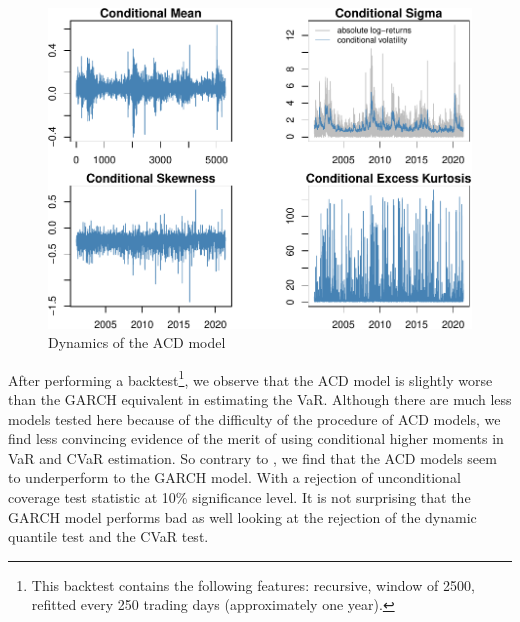 \documentclass[a4paper, nobind]{templates/ociamthesis}
\begin{document}
\begin{figure}[h]

{\centering \includegraphics{_main_files/figure-latex/figureACDmoments-1} 

}

\caption{Dynamics of the ACD model}\label{fig:figureACDmoments}
\end{figure}

\newpage

\noindent After performing a backtest\footnote{This backtest contains the following features: recursive, window of 2500, refitted every 250 trading days (approximately one year).}, we observe that the ACD model is slightly worse than the GARCH equivalent in estimating the VaR. Although there are much less models tested here because of the difficulty of the procedure of ACD models, we find less convincing evidence of the merit of using conditional higher moments in VaR and CVaR estimation. So contrary to \textcite{bali2008}, we find that the ACD models seem to underperform to the GARCH model. With a rejection of unconditional coverage test statistic at 10\% significance level. It is not surprising that the GARCH model performs bad as well looking at the rejection of the dynamic quantile test and the CVaR test.

\newpage
\end{document}
